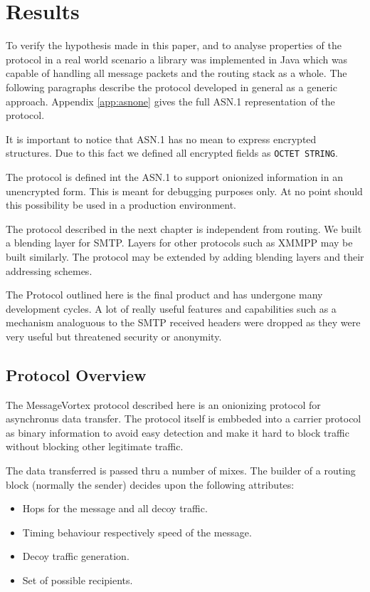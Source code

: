 
\part{Results}
To verify the hypothesis made in this paper, and to analyse properties of the protocol in a real world scenario a library was implemented in Java which was capable of handling all message packets and the routing stack as a whole. The following paragraphs describe the protocol developed in general as a generic approach. Appendix \ref{app:asnone} gives the full ASN.1 representation of the protocol. 

It is important to notice that ASN.1 has no mean to express encrypted structures. Due to this fact we defined all encrypted fields as \verb|OCTET STRING|. 

The protocol is defined int the ASN.1 to support onionized information in an unencrypted form. This is meant for debugging purposes only. At no point should this possibility be used in a production environment.

The protocol described in the next chapter is independent from routing. We built a blending layer for SMTP. Layers for other protocols such as XMMPP may be built similarly. The protocol may be extended by adding blending layers and their addressing schemes.

The Protocol outlined here is the final product and has undergone many development cycles. A lot of really useful features and capabilities such as a mechanism analoguous to the SMTP received headers were dropped as they were very useful but threatened security or anonymity.

\chapter{Protocol Overview}
The MessageVortex protocol described here is an onionizing protocol for asynchronus data transfer. The protocol itself is embbeded into a carrier protocol as binary information to avoid easy detection and make it hard to block traffic without blocking other legitimate traffic.

The data transferred is passed thru a number of mixes. The builder of a routing block (normally the sender) decides upon the following attributes:
\begin{itemize}
	\item Hops for the message and all decoy traffic.
	\item Timing behaviour respectively speed of the message.
	\item Decoy traffic generation.
	\item Set of possible recipients.
\end{itemize}

